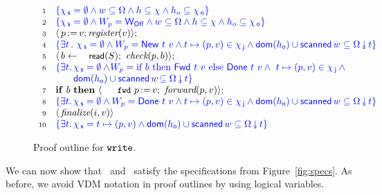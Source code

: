 \documentclass[a4paper,UKenglish]{lipics-v2016}
\newcommand{\asgn}{\leftarrow}
\newcommand{\dom}[1]{\mathsf{dom}(#1)}
\newcommand{\specK}[1]{\ensuremath{\textcolor{blue}{#1}}}
\newcommand{\act}[1]{\textsf{\small{#1}}}
\newcommand{\aux}[1]{\textit{#1}}
\newcommand{\kw}[1]{\text{\textbf{#1}}}
\newcommand{\selfsub}{\mathsf{s}}
\newcommand{\othersub}{\mathsf{o}}
\newcommand{\jointsub}{\mathsf{j}}
\newcommand{\hist}{\chi}
\newcommand{\histS}{\hist_{\, \selfsub}}
\newcommand{\histO}{\hist_{\, \othersub}}
\newcommand{\histJ}{\hist_{\, \jointsub}}
\newcommand{\hempty}{\emptyset}
\newcommand{\hpts}{\mapsto}
\newcommand{\ldot}{\mathord{.}\,}
\def\ordlist{\sigma}
\newcommand{\E}{\tau}
\newcommand{\stableorder}{\Omega}
\def\ordlistP{\sigma'}
\newcommand{\EP}{\tau'}
\newcommand{\wInit}{\mathsf{W_{Off}}}
\newcommand{\wWrite}{\mathsf{New}}
\newcommand{\wDirty}{\mathsf{Fwd}}
\newcommand{\wClean}{\mathsf{Done}}
\newcommand{\num}[1]{{\text{{\scriptsize{#1}}}}}
\def\lat{\langle}
\def\rat{\rangle}
\def\tbnd{\asgn}
\newcommand{\actwrite}[2]{{#1}\,{:=}\,{#2}}
\theoremstyle{definition}
\begin{document}
\begin{figure}[t]
\[
\begin{array}[t]{r l}
  \num{1} & \specK{\{ \histS = \hempty  \wedge
                      w \subseteq \stableorder \wedge h \subseteq \hist \wedge h_o \subseteq \histO \}} \\
  \num{2} & \specK{\{ \histS = \hempty \wedge \wpp =\wInit \wedge
                      w \subseteq \stableorder \wedge h \subseteq \hist \wedge h_o \subseteq \histO \}}\\
  \num{3} &\lat\,\actwrite{p}{v}; \aux{register}(v) \rat; \\
  \num{4} & \specK{\{\exists t\, \ldot\,
                      \histS = \hempty \wedge
                      \wpp = \wWrite\ t\ v \wedge t\hpts(p,v) \in \histJ \wedge
                      \dom{h_{\othersub}} \cup \scanned{w}
                      \subseteq \sideal{\stableorder}{t}\}}\\
  \num{5} & \lat\, b \tbnd \act{read}(S);\ \aux{check}(p,b) \rat;\\
  \num{6} & \specK{\{\exists t\ldot \histS = \hempty \wedge\!
               \wpp =  \textrm{if}\ b\
               \textrm{then}\ \wDirty\ t\ v\ \textrm{else}\ \wClean\ t\ v \wedge\ t\hpts(p,v) \in \histJ \wedge \hbox{}}\\
          & \specK{\hphantom{\{\exists t\ldot \hbox{}}
              \dom{h_{\othersub}} \cup \scanned{w}\!
                   \subseteq \sideal{\stableorder}{t} 
               \}}\\
  \num{7} & \kw{if}\ b\ \kw{then}\ \lat\, \actwrite{\aleksfwdp{p}}{v};\ \aux{forward}(p,v)\rat;\\
  \num{8} & \specK{\{\exists t\ldot \histS = \hempty \wedge
                \wpp = \wClean\ t\ v \wedge t\hpts(p, v) \in \histJ \wedge
                \dom{h_{\othersub}} \cup \scanned{w} \subseteq \sideal{\stableorder}{t} \}}\\
  \num{9} & \lat\,\aux{finalize}(i,v)\rat \\
  \num{10} & \specK{\{\exists t\ldot \histS = t \hpts (p,v) \wedge
              \dom{h_{\othersub}} \cup \scanned{w} \subseteq \sideal{\stableorder}{t} \}}
\end{array}
\]
  \caption{\label{proof:write} Proof outline for $\texttt{write}$.}
\end{figure}

We can now show that \jywrite\ and \jyscan\ satisfy the specifications
from Figure~\ref{fig:specs}.  As before, we avoid VDM notation in
proof outlines by using logical variables.
%
%
%
%
%
%
\end{document}
